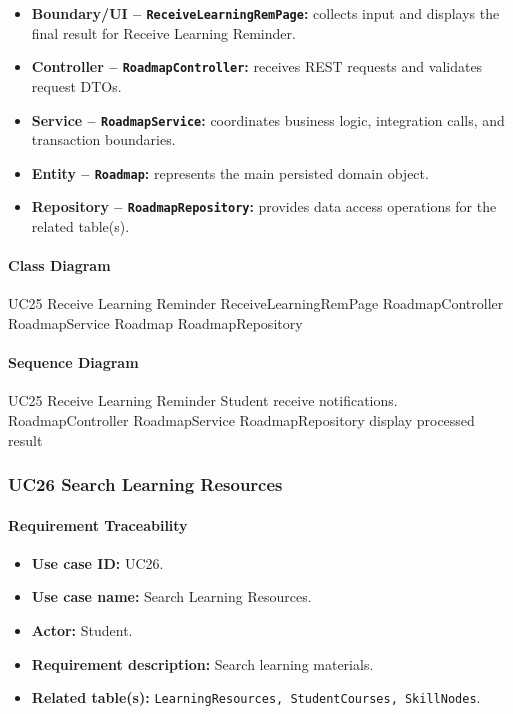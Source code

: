 \begin{itemize}
    \item \textbf{Boundary/UI -- \texttt{ReceiveLearningRemPage}:} collects input and displays the final result for Receive Learning Reminder.
    \item \textbf{Controller -- \texttt{RoadmapController}:} receives REST requests and validates request DTOs.
    \item \textbf{Service -- \texttt{RoadmapService}:} coordinates business logic, integration calls, and transaction boundaries.
    \item \textbf{Entity -- \texttt{Roadmap}:} represents the main persisted domain object.
    \item \textbf{Repository -- \texttt{RoadmapRepository}:} provides data access operations for the related table(s).
\end{itemize}

\paragraph{Class Diagram}

\ClassDiagram
{UC25 Receive Learning Reminder}
{ReceiveLearningRemPage}
{RoadmapController}
{RoadmapService}
{Roadmap}
{RoadmapRepository}

\paragraph{Sequence Diagram}

\SequenceDiagram
{UC25 Receive Learning Reminder}
{Student}
{receive notifications.}
{RoadmapController}
{RoadmapService}
{RoadmapRepository}
{display processed result}

\subsubsection{UC26 Search Learning Resources}

\paragraph{Requirement Traceability}

\begin{itemize}
    \item \textbf{Use case ID:} UC26.
    \item \textbf{Use case name:} Search Learning Resources.
    \item \textbf{Actor:} Student.
    \item \textbf{Requirement description:} Search learning materials.
    \item \textbf{Related table(s):} \texttt{LearningResources, StudentCourses, SkillNodes}.
\end{itemize}

